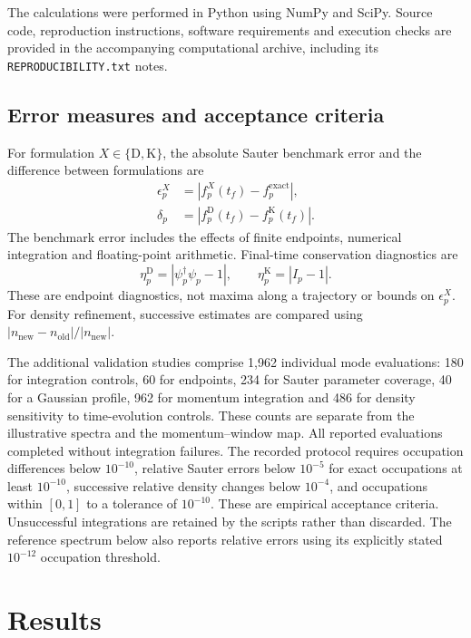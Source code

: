 \documentclass[anonymous]{iopjournal}
\begin{document}
The calculations were performed in Python using NumPy and SciPy. Source code, reproduction instructions, software requirements and execution checks are provided in the accompanying computational archive, including its \texttt{REPRODUCIBILITY.txt} notes.

\subsection{Error measures and acceptance criteria}

For formulation $X\in\{\mathrm D,\mathrm K\}$, the absolute Sauter benchmark error and the difference between formulations are
\begin{align}
  \epsilon_p^X&=\left|f_p^X(t_f)-f_p^{\mathrm{exact}}\right|,\nonumber\\
  \delta_p&=\left|f_p^{\mathrm D}(t_f)-f_p^{\mathrm K}(t_f)\right|.
  \label{eq:errors}
\end{align}
The benchmark error includes the effects of finite endpoints, numerical integration and floating-point arithmetic. Final-time conservation diagnostics are
\begin{equation}
  \eta_p^{\mathrm D}=|\psi_p^\dagger\psi_p-1|,\qquad
  \eta_p^{\mathrm K}=|I_p-1|.
  \label{eq:diagnostics}
\end{equation}
These are endpoint diagnostics, not maxima along a trajectory or bounds on $\epsilon_p^X$. For density refinement, successive estimates are compared using $|n_{\mathrm{new}}-n_{\mathrm{old}}|/|n_{\mathrm{new}}|$.

The additional validation studies comprise 1,962 individual mode evaluations: 180 for integration controls, 60 for endpoints, 234 for Sauter parameter coverage, 40 for a Gaussian profile, 962 for momentum integration and 486 for density sensitivity to time-evolution controls. These counts are separate from the illustrative spectra and the momentum--window map. All reported evaluations completed without integration failures. The recorded protocol requires occupation differences below $10^{-10}$, relative Sauter errors below $10^{-5}$ for exact occupations at least $10^{-10}$, successive relative density changes below $10^{-4}$, and occupations within $[0,1]$ to a tolerance of $10^{-10}$. These are empirical acceptance criteria. Unsuccessful integrations are retained by the scripts rather than discarded. The reference spectrum below also reports relative errors using its explicitly stated $10^{-12}$ occupation threshold.

\FloatBarrier
\section{Results}
\label{sec:results}
\end{document}
